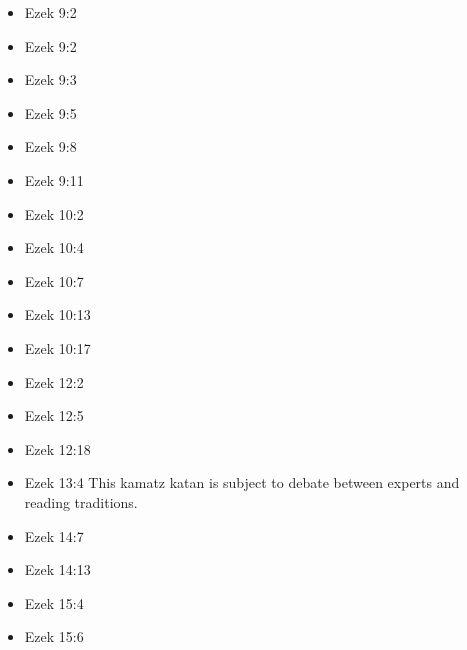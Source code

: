 \documentclass[14pt]{book}
\begin{document}
\begin{multicols}{2}
\begin{itemize}
								\item Ezek 9:2
								
								\item Ezek 9:2
								
								\item Ezek 9:3
								
								\item Ezek 9:5
								
								\item Ezek 9:8
								
								\item Ezek 9:11
								
								\item Ezek 10:2
								
								\item Ezek 10:4
								
								\item Ezek 10:7
								
								\item Ezek 10:13
								
								\item Ezek 10:17
								
								\item Ezek 12:2
								
								\item Ezek 12:5
								
								\item Ezek 12:18
								
								\item Ezek 13:4 This kamatz katan is subject to debate between experts and reading traditions.
								
								\item Ezek 14:7
								
								\item Ezek 14:13
								
								\item Ezek 15:4
										
										\item Ezek 15:6
										

\end{itemize}
\end{multicols}
\end{document}
